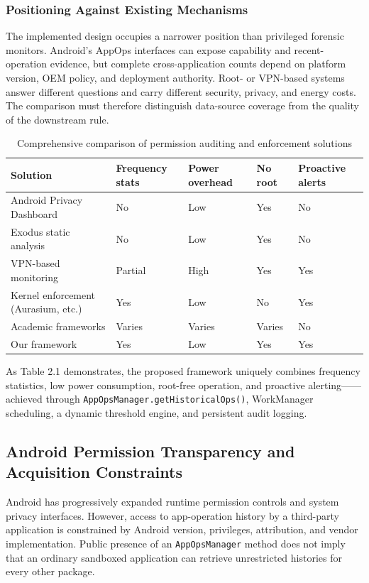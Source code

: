 \subsubsection{Positioning Against Existing Mechanisms}

The implemented design occupies a narrower position than privileged forensic monitors. Android's AppOps interfaces can expose capability and recent-operation evidence, but complete cross-application counts depend on platform version, OEM policy, and deployment authority. Root- or VPN-based systems answer different questions and carry different security, privacy, and energy costs. The comparison must therefore distinguish data-source coverage from the quality of the downstream rule.

\begin{table}[H]
\centering
\caption{Comprehensive comparison of permission auditing and enforcement solutions}
\begin{tabular}{p{2.8cm}p{2.2cm}p{2.2cm}p{2.2cm}p{2.2cm}}
\toprule
\textbf{Solution} & \textbf{Frequency stats} & \textbf{Power overhead} & \textbf{No root} & \textbf{Proactive alerts} \\
\midrule
Android Privacy Dashboard & No & Low & Yes & No \\
Exodus static analysis & No & Low & Yes & No \\
VPN-based monitoring & Partial & High & Yes & Yes \\
Kernel enforcement (Aurasium, etc.) & Yes & Low & No & Yes \\
Academic frameworks & Varies & Varies & Varies & No \\
Our framework & Yes & Low & Yes & Yes \\
\bottomrule
\end{tabular}
\end{table}

As Table 2.1 demonstrates, the proposed framework uniquely combines frequency statistics, low power consumption, root-free operation, and proactive alerting——achieved through \texttt{AppOpsManager.getHistoricalOps()}, WorkManager scheduling, a dynamic threshold engine, and persistent audit logging.

\subsection{Android Permission Transparency and Acquisition Constraints}

Android has progressively expanded runtime permission controls and system privacy interfaces. However, access to app-operation history by a third-party application is constrained by Android version, privileges, attribution, and vendor implementation. Public presence of an \texttt{AppOpsManager} method does not imply that an ordinary sandboxed application can retrieve unrestricted histories for every other package.

